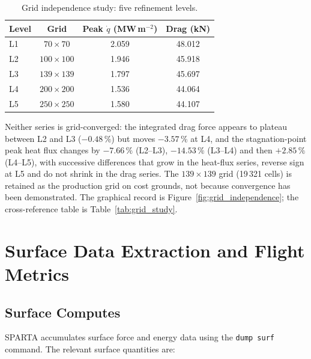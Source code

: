 \begin{table}[H]
    \centering
    \caption{Grid independence study: five refinement levels.}
    \label{tab:mesh_independence}
    \begin{tabular}{|l|c|c|c|}
        \hline
        \textbf{Level} & \textbf{Grid} & \textbf{Peak $\dot q$ (MW\,m$^{-2}$)} & \textbf{Drag (kN)} \\ \hline
        L1 & $70\times70$ & 2.059 & 48.012 \\ \hline
        L2 & $100\times100$ & 1.946 & 45.918 \\ \hline
        L3 & $139\times139$ & 1.797 & 45.697 \\ \hline
        L4 & $200\times200$ & 1.536 & 44.064 \\ \hline
        L5 & $250\times250$ & 1.580 & 44.107 \\ \hline
    \end{tabular}
\end{table}

Neither series is grid-converged: the integrated drag force appears to plateau between L2 and L3 ($-0.48\,\%$) but moves $-3.57\,\%$ at L4, and the stagnation-point peak heat flux changes by $-7.66\,\%$ (L2--L3), $-14.53\,\%$ (L3--L4) and then $+2.85\,\%$ (L4--L5), with successive differences that grow in the heat-flux series, reverse sign at L5 and do not shrink in the drag series. The $139\times139$ grid (19\,321 cells) is retained as the production grid on cost grounds, not because convergence has been demonstrated. The graphical record is Figure~\ref{fig:grid_independence}; the cross-reference table is Table~\ref{tab:grid_study}.

\section{Surface Data Extraction and Flight Metrics}

\subsection{Surface Computes}
SPARTA accumulates surface force and energy data using the \texttt{dump surf} command. The relevant surface quantities are:

